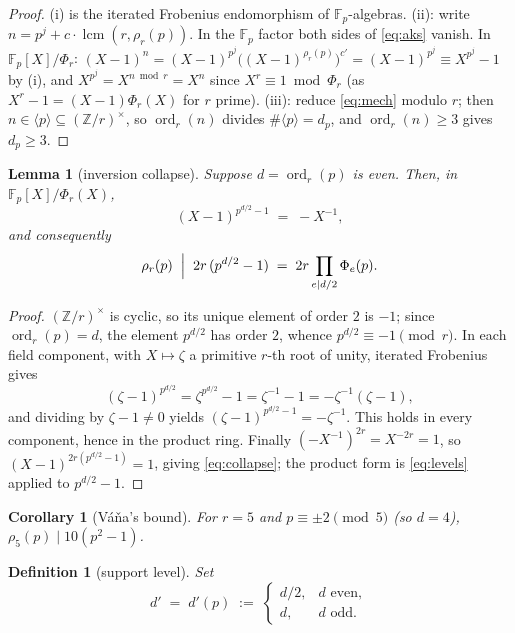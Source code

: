 \documentclass[11pt]{article}
\newtheorem{lemma}[theorem]{Lemma}
\newtheorem{corollary}[theorem]{Corollary}
\newtheorem{definition}[theorem]{Definition}
\theoremstyle{remark}
\newcommand{\Z}{\mathbb{Z}}
\newcommand{\F}{\mathbb{F}}
\DeclareMathOperator{\lcm}{lcm}
\DeclareMathOperator{\ord}{ord}
\begin{document}
\begin{proof}
(i) is the iterated Frobenius endomorphism of $\F_p$-algebras. (ii): write
$n = p^j + c\cdot\lcm(r,\rho_r(p))$. In the $\F_p$ factor both sides of
\eqref{eq:aks} vanish. In $\F_p[X]/\Phi_r$:
$(X-1)^n = (X-1)^{p^j}\bigl((X-1)^{\rho_r(p)}\bigr)^{c'} = (X-1)^{p^j}
\equiv X^{p^j} - 1$ by (i), and $X^{p^j} = X^{n \bmod r} = X^n$ since
$X^r \equiv 1 \bmod \Phi_r$ (as $X^r - 1 = (X-1)\Phi_r(X)$ for $r$ prime).
(iii): reduce \eqref{eq:mech} modulo $r$; then $n \in \langle p \rangle
\subseteq (\Z/r)^\times$, so $\ord_r(n)$ divides
$\#\langle p\rangle = d_p$, and $\ord_r(n) \ge 3$ gives $d_p \ge 3$.
\end{proof}

\begin{lemma}[inversion collapse]\label{lem:collapse}
Suppose $d = \ord_r(p)$ is even. Then, in $\F_p[X]/\Phi_r(X)$,
\[
(X-1)^{p^{d/2}-1} \;=\; -X^{-1},
\]
and consequently
\begin{equation}\label{eq:collapse}
\rho_r(p) \;\Bigm|\; 2r\,(p^{d/2}-1) \;=\; 2r \prod_{e \mid d/2} \Phi_e(p).
\end{equation}
\end{lemma}

\begin{proof}
$(\Z/r)^\times$ is cyclic, so its unique element of order $2$ is $-1$; since
$\ord_r(p) = d$, the element $p^{d/2}$ has order $2$, whence
$p^{d/2} \equiv -1 \pmod r$. In each field component, with $X \mapsto
\zeta$ a primitive $r$-th root of unity, iterated Frobenius gives
\[
(\zeta - 1)^{p^{d/2}} = \zeta^{p^{d/2}} - 1 = \zeta^{-1} - 1
= -\zeta^{-1}(\zeta - 1),
\]
and dividing by $\zeta - 1 \ne 0$ yields $(\zeta-1)^{p^{d/2}-1} =
-\zeta^{-1}$. This holds in every component, hence in the product ring.
Finally $(-X^{-1})^{2r} = X^{-2r} = 1$, so
$(X-1)^{2r(p^{d/2}-1)} = 1$, giving \eqref{eq:collapse}; the product form is
\eqref{eq:levels} applied to $p^{d/2}-1$.
\end{proof}

\begin{corollary}[V\'a\v{n}a's bound]\label{cor:vana}
For $r = 5$ and $p \equiv \pm 2 \pmod 5$ (so $d = 4$),
$\rho_5(p) \mid 10(p^2 - 1)$.
\end{corollary}

\begin{definition}[support level]\label{def:support}
Set
\[
d' \;=\; d'(p) \;:=\;
\begin{cases}
d/2, & d \text{ even},\\
d, & d \text{ odd}.
\end{cases}
\]
\end{definition}
\end{document}
